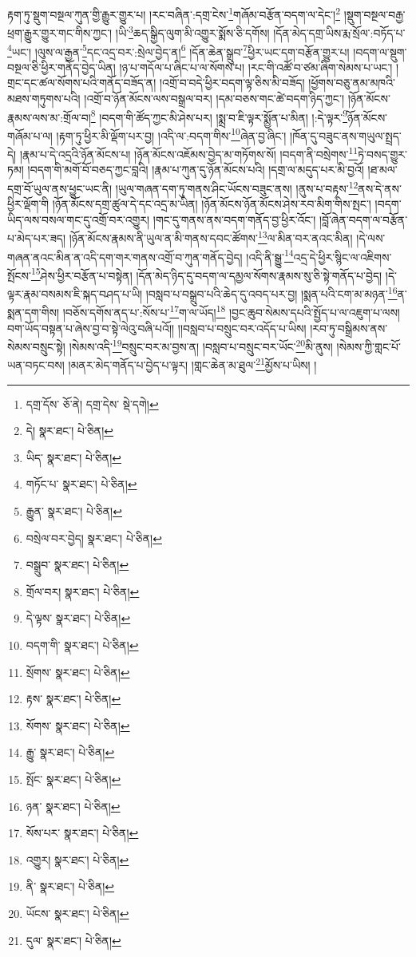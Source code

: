 རྟག་ཏུ་སྡུག་བསྔལ་ཀུན་གྱི་རྒྱུར་གྱུར་པ། །རང་བཞིན་:དགྲ་ངེས་\footnote{དགྲ་དོས་  ཅོ་ནེ། དགྲ་དེས་  སྡེ་དགེ། }གཞོམ་བརྩོན་བདག་ལ་དེང་།\footnote{དེ།  སྣར་ཐང་།  པེ་ཅིན། } །སྡུག་བསྔལ་བརྒྱ་ཕྲག་རྒྱུར་གྱུར་གང་གིས་ཀྱང་། །ཡི་\footnote{ཡིད་  སྣར་ཐང་།  པེ་ཅིན། }ཆད་སྒྱིད་ལུག་མི་འགྱུར་སྨོས་ཅི་དགོས། །དོན་མེད་དགྲ་ཡིས་རྨ་སྲོལ་:བཏོད་པ་\footnote{གཏོང་པ་  སྣར་ཐང་།  པེ་ཅིན། }ཡང་། །ལུས་ལ་རྒྱན་\footnote{རྒྱུན་  སྣར་ཐང་།  པེ་ཅིན། }དང་འདྲ་བར་:སྲེལ་བྱེད་ན།\footnote{བསྲེལ་བར་བྱེད།  སྣར་ཐང་།  པེ་ཅིན། } །དོན་ཆེན་སྒྲུབ་\footnote{བསྒྲུབ་  སྣར་ཐང་།  པེ་ཅིན། }ཕྱིར་ཡང་དག་བརྩོན་གྱུར་པ། །བདག་ལ་སྡུག་བསྔལ་ཅི་ཕྱིར་གནོད་བྱེད་ཡིན། །ཉ་པ་གདོལ་པ་ཞིང་པ་ལ་སོགས་པ། །རང་གི་འཚོ་བ་ཙམ་ཞིག་སེམས་པ་ཡང་། །གྲང་དང་ཚལ་སོགས་པའི་གནོད་བཟོད་ན། །འགྲོ་བ་བདེ་ཕྱིར་བདག་ལྟ་ཅིས་མི་བཟོད། །ཕྱོགས་བཅུ་ནམ་མཁའི་མཐས་གཏུགས་པའི། །འགྲོ་བ་ཉོན་མོངས་ལས་བསྒྲལ་བར། །དམ་བཅས་གང་ཚེ་བདག་ཉིད་ཀྱང་། །ཉོན་མོངས་རྣམས་ལས་མ་:གྲོལ་བ།\footnote{གྲོལ་བར།  སྣར་ཐང་།  པེ་ཅིན། } །བདག་གི་ཚོད་ཀྱང་མི་ཤེས་པར། །སྨྲ་བ་ཇི་ལྟར་སྨྱོན་པ་མིན། །:དེ་ལྟར་\footnote{དེ་ལྟས་  སྣར་ཐང་།  པེ་ཅིན། }ཉོན་མོངས་གཞོམ་པ་ལ། །རྟག་ཏུ་ཕྱིར་མི་ལྡོག་པར་བྱ། །འདི་ལ་:བདག་གིས་\footnote{བདག་གི་  སྣར་ཐང་།  པེ་ཅིན། }ཞེན་བྱ་ཞིང་། །ཁོན་དུ་བཟུང་ནས་གཡུལ་སྤྲད་དེ། །རྣམ་པ་དེ་འདྲའི་ཉོན་མོངས་པ། །ཉོན་མོངས་འཇོམས་བྱེད་མ་གཏོགས་སོ། །བདག་ནི་བསྲེགས་\footnote{སྲོགས་  སྣར་ཐང་།  པེ་ཅིན། }ཏེ་བསད་གྱུར་ཏམ། །བདག་གི་མགོ་བོ་བཅད་ཀྱང་བླའི། །རྣམ་པ་ཀུན་དུ་ཉོན་མོངས་པའི། །དགྲ་ལ་མདུད་པར་མི་བྱའོ། །ཐ་མལ་དགྲ་བོ་ཡུལ་ནས་ཕྱུང་ཡང་ནི། །ཡུལ་གཞན་དག་ཏུ་གནས་ཤིང་ཡོངས་བཟུང་ནས། །ནུས་པ་བརྟས་\footnote{རྟས་  སྣར་ཐང་།  པེ་ཅིན། }ནས་དེ་ནས་ཕྱིར་ལྡོག་གི །ཉོན་མོངས་དགྲ་ཚུལ་དེ་དང་འདྲ་མ་ཡིན། །ཉོན་མོངས་ཉོན་མོངས་ཤེས་རབ་མིག་གིས་སྤང་། །བདག་ཡིད་ལས་བསལ་གང་དུ་འགྲོ་བར་འགྱུར། །གང་དུ་གནས་ནས་བདག་གནོད་བྱ་ཕྱིར་འོང་། །བློ་ཞེན་བདག་ལ་བརྩོན་པ་མེད་པར་ཟད། །ཉོན་མོངས་རྣམས་ནི་ཡུལ་ན་མི་གནས་དབང་ཚོགས་\footnote{སོགས་  སྣར་ཐང་།  པེ་ཅིན། }ལ་མིན་བར་ནའང་མིན། །དེ་ལས་གཞན་ནའང་མིན་ན་འདི་དག་གར་གནས་འགྲོ་བ་ཀུན་གནོད་བྱེད། །འདི་ནི་སྒྱུ་\footnote{རྒྱུ་  སྣར་ཐང་།  པེ་ཅིན། }འདྲ་དེ་ཕྱིར་སྙིང་ལ་འཇིགས་སྤོངས་\footnote{སྤོང་  སྣར་ཐང་།  པེ་ཅིན། }ཤེས་ཕྱིར་བརྩོན་པ་བསྟེན། །དོན་མེད་ཉིད་དུ་བདག་ལ་དམྱལ་སོགས་རྣམས་སུ་ཅི་སྟེ་གནོད་པ་བྱེད། །དེ་ལྟར་རྣམ་བསམས་ཇི་སྐད་བཤད་པ་ཡི། །བསླབ་པ་བསྒྲུབ་པའི་ཆེད་དུ་འབད་པར་བྱ། །སྨན་པའི་ངག་མ་མཉན་\footnote{ཉན་  སྣར་ཐང་།  པེ་ཅིན། }ན་སྨན་དག་གིས། །བཅོས་དགོས་ནད་པ་:སོས་པ་\footnote{སོས་པར་  སྣར་ཐང་།  པེ་ཅིན། }ག་ལ་ཡོད།\footnote{འགྱུར།  སྣར་ཐང་།  པེ་ཅིན། } །བྱང་ཆུབ་སེམས་དཔའི་སྤྱོད་པ་ལ་འཇུག་པ་ལས། བག་ཡོད་བསྟན་པ་ཞེས་བྱ་བ་སྟེ་ལེའུ་བཞི་པའོ།། །།བསླབ་པ་བསྲུང་བར་འདོད་པ་ཡིས། །རབ་ཏུ་བསྒྲིམས་ནས་སེམས་བསྲུང་སྟེ། །སེམས་འདི་\footnote{ནི་  སྣར་ཐང་།  པེ་ཅིན། }བསྲུང་བར་མ་བྱས་ན། །བསླབ་པ་བསྲུང་བར་ཡོང་\footnote{ཡོངས་  སྣར་ཐང་།  པེ་ཅིན། }མི་ནུས། །སེམས་ཀྱི་གླང་པོ་ཡན་བཏང་བས། །མནར་མེད་གནོད་པ་བྱེད་པ་ལྟར། །གླང་ཆེན་མ་ཐུལ་\footnote{དུལ་  སྣར་ཐང་།  པེ་ཅིན། }མྱོས་པ་ཡིས། །
